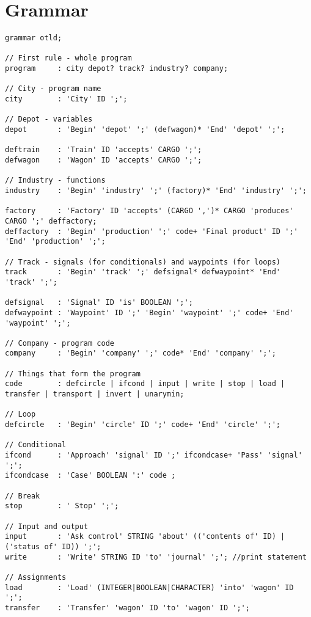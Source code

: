 \chapter{Grammar}

\begin{landscape}
\begin{lstlisting}[style=Antlr]
grammar otld;

// First rule - whole program
program     : city depot? track? industry? company;

// City - program name
city        : 'City' ID ';';

// Depot - variables
depot       : 'Begin' 'depot' ';' (defwagon)* 'End' 'depot' ';';

deftrain    : 'Train' ID 'accepts' CARGO ';';
defwagon    : 'Wagon' ID 'accepts' CARGO ';';

// Industry - functions
industry    : 'Begin' 'industry' ';' (factory)* 'End' 'industry' ';';

factory     : 'Factory' ID 'accepts' (CARGO ',')* CARGO 'produces' CARGO ';' deffactory;
deffactory  : 'Begin' 'production' ';' code+ 'Final product' ID ';' 'End' 'production' ';';

// Track - signals (for conditionals) and waypoints (for loops)
track       : 'Begin' 'track' ';' defsignal* defwaypoint* 'End' 'track' ';';

defsignal   : 'Signal' ID 'is' BOOLEAN ';';
defwaypoint : 'Waypoint' ID ';' 'Begin' 'waypoint' ';' code+ 'End' 'waypoint' ';';

// Company - program code
company     : 'Begin' 'company' ';' code* 'End' 'company' ';';

// Things that form the program
code        : defcircle | ifcond | input | write | stop | load | transfer | transport | invert | unarymin;

// Loop
defcircle   : 'Begin' 'circle' ID ';' code+ 'End' 'circle' ';';

// Conditional
ifcond      : 'Approach' 'signal' ID ';' ifcondcase+ 'Pass' 'signal' ';';
ifcondcase  : 'Case' BOOLEAN ':' code ;

// Break
stop        : ' Stop' ';';

// Input and output
input       : 'Ask control' STRING 'about' (('contents of' ID) | ('status of' ID)) ';';
write       : 'Write' STRING ID 'to' 'journal' ';'; //print statement

// Assignments
load        : 'Load' (INTEGER|BOOLEAN|CHARACTER) 'into' 'wagon' ID ';';
transfer    : 'Transfer' 'wagon' ID 'to' 'wagon' ID ';';


\end{lstlisting}
\end{landscape}
